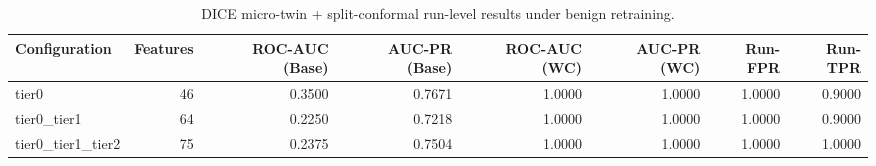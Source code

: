\begin{table}[t]
\centering
\caption{DICE micro-twin + split-conformal run-level results under benign retraining.}
\label{tab:dice_full_overall}
\footnotesize
\begin{tabular}{lrrrrrrr}
\toprule
Configuration & Features & ROC-AUC (Base) & AUC-PR (Base) & ROC-AUC (WC) & AUC-PR (WC) & Run-FPR & Run-TPR \\
\midrule
tier0 & 46 & 0.3500 & 0.7671 & 1.0000 & 1.0000 & 1.0000 & 0.9000 \\
tier0_tier1 & 64 & 0.2250 & 0.7218 & 1.0000 & 1.0000 & 1.0000 & 0.9000 \\
tier0_tier1_tier2 & 75 & 0.2375 & 0.7504 & 1.0000 & 1.0000 & 1.0000 & 1.0000 \\
\bottomrule
\end{tabular}

\end{table}
